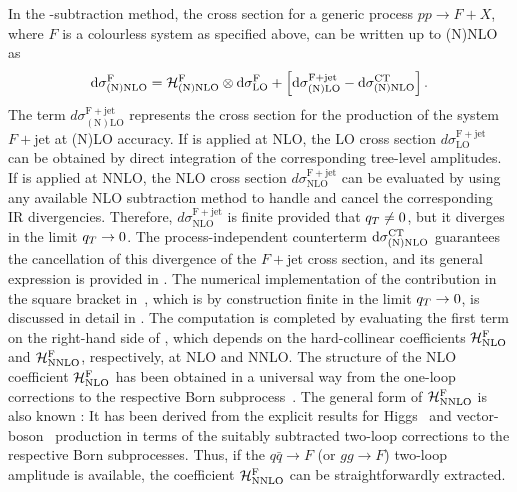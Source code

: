 \documentclass[english,11pt]{article}
\begin{document}
In the \qt{}-subtraction method, the cross section for a generic process $pp\to F+X$, where $F$ is a colourless system as specified above, 
can be written up to (N)NLO as
\begin{equation}
\label{eq:main}
{\rm d}{\sigma}^{\mathrm{F}}_{\mathrm{(N)NLO}}={\cal H}^{\mathrm{F}}_{\mathrm{(N)NLO}}\otimes {\rm d}{\sigma}^{\mathrm{F}}_{\mathrm{LO}}
+\left[ {\rm d}{\sigma}^{\mathrm{F + jet}}_{\mathrm{(N)LO}}-
{\rm d}{\sigma}^{\mathrm{CT}}_{\mathrm{(N)NLO}}\right].
\end{equation}
The term $d{\sigma}^{\mathrm{F + jet}}_{\mathrm{(N)LO}}$ represents the cross
section for the production of the system $F+$jet at (N)LO accuracy.
If  is applied at NLO, the LO cross section $d{\sigma}^{\mathrm{F + jet}}_{\mathrm{LO}}$ can be obtained by direct integration of the corresponding tree-level amplitudes. If  is applied at NNLO, the NLO cross section $d{\sigma}^{\mathrm{F + jet}}_{\mathrm{NLO}}$ can be evaluated by using any available NLO subtraction method \cite{Frixione:1995ms,Frixione:1997np,Catani:1996jh,Catani:1996vz} to handle and cancel the corresponding IR divergencies.
Therefore, $d{\sigma}^{\mathrm{F + jet}}_{\mathrm{NLO}}$ is finite provided that $q_T\neq 0$, but it diverges in the limit $q_T\to 0$.
The process-independent counterterm 
$\mathrm{d}{\sigma}^{\mathrm{CT}}_{\mathrm{(N)NLO}}$ guarantees the cancellation of this divergence of
the $F+$jet cross section, and its general expression is provided in .
The numerical implementation of the contribution in the square bracket in~, which is 
by construction finite in the limit $q_T\to0$, is discussed in detail in .
The computation is completed by evaluating the first term on the right-hand side of , which
depends on the hard-collinear coefficients ${\cal H}^{\mathrm{F}}_{\mathrm{NLO}}$ and ${\cal H}^{\mathrm{F}}_{\mathrm{NNLO}}$, respectively, at NLO and NNLO.
The structure of the NLO coefficient ${\cal H}^{\mathrm{F}}_{\mathrm{NLO}}$ has been obtained in a universal way 
from the one-loop corrections to the respective Born subprocess~\cite{deFlorian:2001zd}.
The general form of ${\cal H}^{\mathrm{F}}_{\mathrm{NNLO}}$ is also known \cite{Catani:2013tia}: It has been derived from
the explicit results for Higgs~\cite{Catani:2011kr} and vector-boson~\cite{Catani:2012qa} production
in terms of the suitably subtracted two-loop corrections to the respective Born subprocesses.
Thus, if the $q{\bar q}\to F$ (or $gg\to F$) two-loop amplitude is available, the coefficient ${\cal H}^{\mathrm{F}}_{\mathrm{NNLO}}$ can be straightforwardly extracted.
\end{document}
